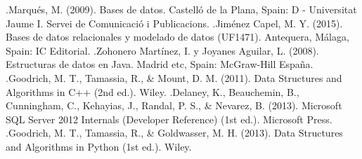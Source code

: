 \documentclass[twoside,twocolumn]{article}
\begin{document}
\begin{thebibliography}{99} %

\bibitem
[1].Marqués, M. (2009). Bases de datos. Castelló de la Plana, Spain: D - Universitat Jaume I. Servei de Comunicació i Publicacions. 
\bibitem
[2].Jiménez Capel, M. Y. (2015). Bases de datos relacionales y modelado de datos (UF1471). Antequera, Málaga, Spain: IC Editorial.
\bibitem
[3].Zohonero Martínez, I. y Joyanes Aguilar, L. (2008). Estructuras de datos en Java. Madrid etc, Spain: McGraw-Hill España.
\bibitem
[4].Goodrich, M. T., Tamassia, R., \& Mount, D. M. (2011). Data Structures and Algorithms in C++ (2nd ed.). Wiley.
\bibitem
[5].Delaney, K., Beauchemin, B., Cunningham, C., Kehayias, J., Randal, P. S., \& Nevarez, B. (2013). Microsoft SQL Server 2012 Internals (Developer Reference) (1st ed.). Microsoft Press.
\bibitem
[6].Goodrich, M. T., Tamassia, R., \& Goldwasser, M. H. (2013). Data Structures and Algorithms in Python (1st ed.). Wiley.
\end{thebibliography}

\end{document}
